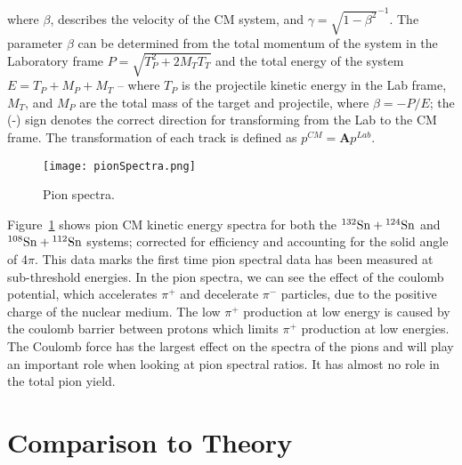 where $\beta$, describes the velocity of the CM system, and $\gamma=\sqrt{1-\beta^2}^{-1}$. The parameter $\beta$ can be determined from the total momentum of the system in the Laboratory frame $P = \sqrt{ T_{P}^2 + 2M_{T}T_{T}}$ and the total energy of the system $E = T_{P} + M_{P} + M_{T}$ -- where $T_{P}$ is the projectile kinetic energy in the Lab frame, $M_{T}$, and $M_{P}$ are the total mass of the target and projectile, where $\beta = -P/E$; the (-) sign denotes the correct direction for transforming from the Lab to the CM frame. The transformation of each  track is defined as $p^{CM} = \textbf{A}p^{Lab}$.

\begin{figure}[!htb]
\centering
\texttt{[image: pionSpectra.png]}
\caption{Pion spectra. }
\label{fig:pionspectra}
\end{figure}


Figure~\ref{fig:pionspectra} shows pion CM kinetic energy spectra for both the ${}^{132}\mathrm{Sn} + {}^{124}\mathrm{Sn}$ and ${}^{108}\mathrm{Sn} + {}^{112}\mathrm{Sn}$ systems; corrected for efficiency and accounting for the solid angle of 4$\pi$. This data marks the first time pion spectral data  has been measured at sub-threshold energies. In the pion spectra, we can see the effect of the coulomb potential, which accelerates $\pi^+$ and decelerate $\pi^-$ particles, due to the positive charge of the nuclear medium. The low $\pi^+$ production at low energy is caused by the coulomb barrier between protons which limits $\pi^+$ production at low energies. The Coulomb force has the largest effect on the spectra of the pions and will play an important role when looking at pion spectral ratios. It has almost no role in the total pion yield. 






\section{Comparison to Theory}

